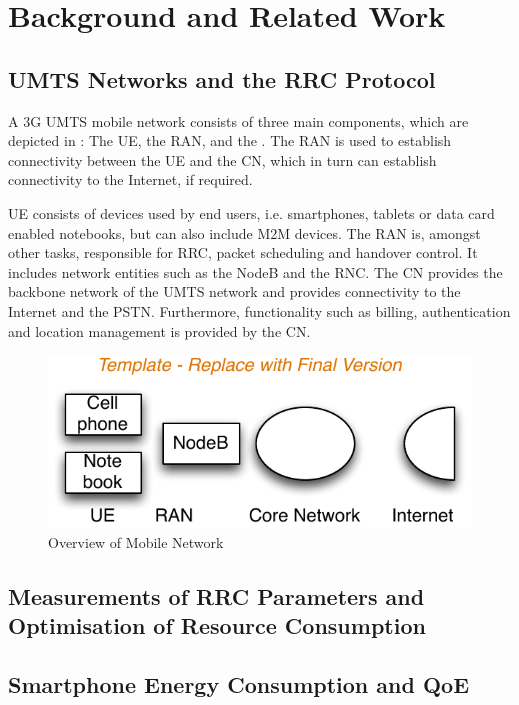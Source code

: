 \section{Background and Related Work}\label{sec:network:background}

\subsection{\acrshort{UMTS} Networks and the \acrshort{RRC} Protocol}\label{sec:network:background:umts_rrc}
A \gls{3G} \gls{UMTS} mobile network consists of three main components, which are depicted in : The \gls{UE}, the \gls{RAN}, and the .
The \gls{RAN} is used to establish connectivity between the \gls{UE} and the \gls{CN}, which in turn can establish connectivity to the Internet, if required.

\gls{UE} consists of devices used by end users, i.e. smartphones, tablets or data card enabled notebooks, but can also include \gls{M2M} devices.
The \gls{RAN} is, amongst other tasks, responsible for \gls{RRC}, packet scheduling and handover control.
It includes network entities such as the \gls{NodeB} and the \gls{RNC}.
The \gls{CN} provides the backbone network of the \gls{UMTS} network and provides connectivity to the Internet and the \gls{PSTN}.
Furthermore, functionality such as billing, authentication and location management is provided by the \gls{CN}.

\begin{figure}
	\centering
	\includegraphics{network/background/figures/mobile_network_overview}
	\caption{Overview of Mobile Network}
	\label{fig:network:background:mobile_network_overview}
\end{figure}

\subsection{Measurements of \acrshort{RRC} Parameters and Optimisation of Resource Consumption}\label{sec:network:background:measurement_optimisation}

\subsection{Smartphone Energy Consumption and \acrshort{QoE}}\label{sec:network:background:energy_consumption_qoe}
